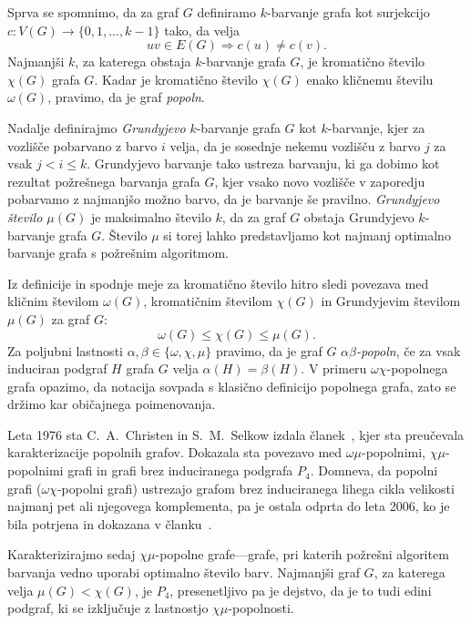 \documentclass[12pt,a4paper,twoside]{article}
\theoremstyle{definition} %
\theoremstyle{plain} %
\numberwithin{equation}{section}  %
\begin{document}
\medskip
Sprva se spomnimo, da za graf $G$ definiramo $k$-barvanje grafa kot surjekcijo $c: V(G) \rightarrow \{0, 1, ..., k-1\}$ tako, da velja $$uv \in E(G) \Rightarrow c(u) \neq c(v).$$ Najmanjši $k$, za katerega obstaja $k$-barvanje grafa $G$, je kromatično število $\chi(G)$ grafa $G$. Kadar je kromatično število $\chi(G)$ enako kličnemu številu $\omega(G)$, pravimo, da je graf \emph{popoln}.  

\medskip
Nadalje definirajmo \emph{Grundyjevo} $k$-barvanje grafa $G$ kot $k$-barvanje, kjer za vozlišče pobarvano z barvo $i$ velja, da je sosednje nekemu vozlišču z barvo $j$ za vsak $j < i \leq k$. Grundyjevo barvanje tako ustreza barvanju, ki ga dobimo kot rezultat požrešnega barvanja grafa $G$, kjer vsako novo vozlišče v zaporedju  pobarvamo z najmanjšo možno barvo, da je barvanje še pravilno. \emph{Grundyjevo število $\mu(G)$} je maksimalno število $k$, da za graf $G$ obstaja Grundyjevo $k$-barvanje grafa $G$. Število $\mu$ si torej lahko predstavljamo kot najmanj optimalno barvanje grafa s požrešnim algoritmom.

Iz definicije in spodnje meje za kromatično število hitro sledi povezava med kličnim številom $\omega(G)$, kromatičnim številom $\chi(G)$ in Grundyjevim številom $\mu(G)$ za graf $G$: $$\omega(G) \leq \chi(G) \leq \mu(G).$$ Za poljubni lastnosti $\alpha, \beta \in \{\omega, \chi, \mu\}$ pravimo, da je graf $G$ \emph{$\alpha\beta$-popoln}, če za vsak induciran podgraf $H$ grafa $G$ velja $\alpha(H) = \beta(H)$. V primeru $\omega\chi$-popolnega grafa opazimo, da notacija sovpada s klasično definicijo popolnega grafa, zato se držimo kar običajnega poimenovanja.

Leta 1976 sta C.~A.~Christen in S.~M.~Selkow izdala članek~\cite{christen1979some}, kjer sta preučevala karakterizacije popolnih grafov. Dokazala sta povezavo med $\omega\mu$-popolnimi, $\chi\mu$-popolnimi grafi in grafi brez induciranega podgrafa $P_4$. Domneva, da popolni grafi ($\omega\chi$-popolni grafi) ustrezajo grafom brez induciranega lihega cikla velikosti najmanj pet ali njegovega komplementa, pa je ostala odprta do leta 2006, ko je bila potrjena in dokazana v članku~\cite{chudnovsky2006strong}. 

Karakterizirajmo sedaj $\chi\mu$-popolne grafe---grafe, pri katerih požrešni algoritem barvanja vedno  uporabi optimalno število barv. Najmanjši graf $G$, za katerega velja $\mu(G) < \chi(G)$, je $P_4$, presenetljivo pa je dejstvo, da je to tudi edini podgraf, ki se izključuje z lastnostjo $\chi\mu$-popolnosti.
\end{document}
